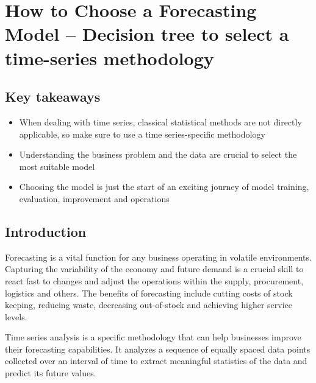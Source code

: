 %
%
%
%





\chapter{How to Choose a Forecasting Model --
    Decision tree to select a time-series methodology}

\section{Key takeaways}

\begin{itemize}
  \item When dealing with time series, classical statistical methods are not directly applicable, so make sure to use a time series-specific methodology
  \item Understanding the business problem and the data are crucial to select the most suitable model
  \item Choosing the model is just the start of an exciting journey of model training, evaluation, improvement and operations
\end{itemize}

\section{Introduction}

Forecasting is a vital function for any business operating in volatile environments. Capturing the variability of the economy and future demand is a crucial skill to react fast to changes and adjust the operations within the supply, procurement, logistics and others. The benefits of forecasting include cutting costs of stock keeping, reducing waste, decreasing out-of-stock and achieving higher service levels.

Time series analysis is a specific methodology that can help businesses improve their forecasting capabilities. It analyzes a sequence of equally spaced data points collected over an interval of time to extract meaningful statistics of the data and predict its future values.

